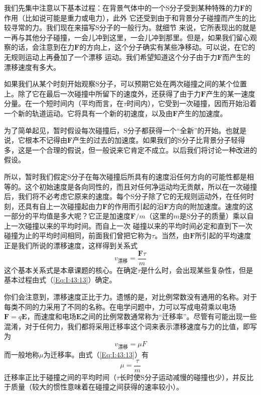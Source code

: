 我们先集中注意以下基本过程：在背景气体中的一个S分子受到某种特殊的力$\boldsymbol{F}$的作用（比如说可能是重力或电力），此外 它还受到由于和背景分子碰撞而产生的比较寻常的力。我们现在来描写S分子的一般行为。就细节 来说，它所表现出的就是一再与其他分子碰撞，一会儿冲到这里，一会儿冲到那里。但是，如果我们留心观察的话，会注意到在力$\boldsymbol{F}$的方向上，这个分子确实有某些净移动。可以说，在它的无规则运动上再叠加了一个漂移 运动。我们希望知道这个分子由于力$\boldsymbol{F}$而产生的漂移速度有多大。

如果我们从某个时刻开始观察S分子，可以预期它处在两次碰撞之间的某个位置上。除了它在最后一次碰撞中所留下的速度外，还获得了由于力$\boldsymbol{F}$产生的某一速度分量。在一个短时间内（平均而言，在$\tau$时间内），它受到一次碰撞，因而开始沿着一个新的轨道运动。它将具有一个新的初速度，以及由$\boldsymbol{F}$产生的加速度。

为了简单起见，暂时假设每次碰撞后，S分子都获得一个“全新”的开始。也就是说，它根本不记得由$\boldsymbol{F}$产生的过去的加速度。如果我们的S分子比背景分子轻得多，这是一个合理的假说，但一般说来它肯定不成立。以后我们将讨论一种改进的假设。

所以，暂时我们假定S分子在每次碰撞后所具有的速度沿任何方向的可能性都是相等的。这个初始速度是各向同性的，而且对任何净运动均无贡献，所以在一次碰撞后，我们将不必考虑它原来的速度。每个S分子除了它的无规则运动外，在任何时刻，还具有自上一次碰撞起由力$\boldsymbol{F}$的作用而引起的沿$\boldsymbol{F}$方向的附加速度。速度的这一部分的平均值是多大呢？它正是加速度$\boldsymbol{F}/m$（这里的$m$是S分子的质量）乘以自上一次碰撞以来的平均时间。而自上一次 碰撞以来的平均时间必定和直到下一次碰撞为止的平均时间相同，前面我们曾把它称为$\tau$。当然，由$\boldsymbol{F}$所引起的平均速度正是我们所说的漂移速度，这样得到关系式
\begin{equation}
    \label{Eq:I:43:13}
    v_\text{漂移} = \frac{\boldsymbol{F}\tau}{m}
\end{equation}
这个基本关系式是本章课题的核心。在确定$\tau$是什么时，会出现某些复杂性，但是基本过程由式（\ref{Eq:I:43:13}）确定。

你们会注意到，漂移速度正比于力。遗憾的是，对比例常数没有通用的名称。对于每类不同的力采用了不同的名称。在电学问题中，力可以写成电荷乘以电场$\boldsymbol{F}=q\boldsymbol{E}$，而速度和电场$\boldsymbol{E}$之间的比例常数通常称为“迁移率”。尽管有可能出现一些混淆，对于任何力，我们都将采用迁移率这个词来表示漂移速度与力的比值，即写为
\begin{equation}
    \label{Eq:I:43:14}
    v_\text{漂移} = \mu F
\end{equation}
而一般地称$\mu$为迁移率。由式（\ref{Eq:I:43:13}）有
\begin{equation}
    \label{Eq:I:43:15}
    \mu=\frac{\tau}{m}
\end{equation}
迁移率正比于碰撞之间的平均时间（$\tau$长时使S分子运动减慢的碰撞也少），并反比于质量（较大的惯性意味着在碰撞之间获得的速率较小）。

